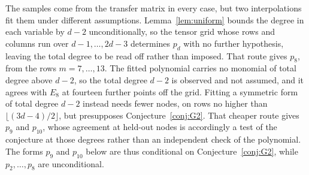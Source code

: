 \documentclass[11pt]{article}
\theoremstyle{definition}
\theoremstyle{remark}
\begin{document}
The samples come from the transfer matrix in every case, but two interpolations
fit them under different assumptions.
Lemma~\ref{lem:uniform} bounds the degree in each variable by $d-2$
unconditionally, so the tensor grid whose rows and columns run over
$d-1,\dots,2d-3$ determines $p_d$ with no further hypothesis, leaving the total
degree to be read off rather than imposed. That route gives $p_8$, from the rows
$m=7,\dots,13$. The fitted polynomial carries no monomial of total degree above
$d-2$, so the total degree $d-2$ is observed and not assumed, and it agrees with $E_8$ at
fourteen further points off the grid. Fitting a symmetric form of total degree
$d-2$ instead needs fewer nodes, on rows no higher than
$\lfloor(3d-4)/2\rfloor$, but presupposes Conjecture~\ref{conj:G2}. That cheaper
route gives $p_9$ and
$p_{10}$, whose agreement at held-out nodes is accordingly a test of the
conjecture at those degrees rather than an independent check of the polynomial.
The forms $p_9$ and $p_{10}$ below are thus conditional on
Conjecture~\ref{conj:G2}, while $p_2,\dots,p_8$ are unconditional.
\end{document}
